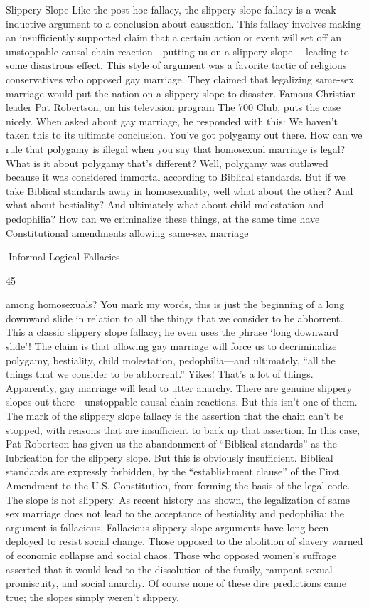 Slippery Slope
Like the post hoc fallacy, the slippery slope fallacy is a weak inductive argument to a conclusion
about causation. This fallacy involves making an insufficiently supported claim that a certain
action or event will set off an unstoppable causal chain-reaction—putting us on a slippery slope—
leading to some disastrous effect.
This style of argument was a favorite tactic of religious conservatives who opposed gay marriage.
They claimed that legalizing same-sex marriage would put the nation on a slippery slope to
disaster. Famous Christian leader Pat Robertson, on his television program The 700 Club, puts the
case nicely. When asked about gay marriage, he responded with this:
We haven’t taken this to its ultimate conclusion. You’ve got polygamy out there. How can
we rule that polygamy is illegal when you say that homosexual marriage is legal? What is
it about polygamy that’s different? Well, polygamy was outlawed because it was
considered immortal according to Biblical standards. But if we take Biblical standards
away in homosexuality, well what about the other? And what about bestiality? And
ultimately what about child molestation and pedophilia? How can we criminalize these
things, at the same time have Constitutional amendments allowing same-sex marriage

Informal Logical Fallacies

45

among homosexuals? You mark my words, this is just the beginning of a long downward
slide in relation to all the things that we consider to be abhorrent.
This a classic slippery slope fallacy; he even uses the phrase ‘long downward slide’! The claim is
that allowing gay marriage will force us to decriminalize polygamy, bestiality, child molestation,
pedophilia—and ultimately, “all the things that we consider to be abhorrent.” Yikes! That’s a lot
of things. Apparently, gay marriage will lead to utter anarchy.
There are genuine slippery slopes out there—unstoppable causal chain-reactions. But this isn’t one
of them. The mark of the slippery slope fallacy is the assertion that the chain can’t be stopped,
with reasons that are insufficient to back up that assertion. In this case, Pat Robertson has given us
the abandonment of “Biblical standards” as the lubrication for the slippery slope. But this is
obviously insufficient. Biblical standards are expressly forbidden, by the “establishment clause”
of the First Amendment to the U.S. Constitution, from forming the basis of the legal code. The
slope is not slippery. As recent history has shown, the legalization of same sex marriage does not
lead to the acceptance of bestiality and pedophilia; the argument is fallacious.
Fallacious slippery slope arguments have long been deployed to resist social change. Those
opposed to the abolition of slavery warned of economic collapse and social chaos. Those who
opposed women’s suffrage asserted that it would lead to the dissolution of the family, rampant
sexual promiscuity, and social anarchy. Of course none of these dire predictions came true; the
slopes simply weren’t slippery.

